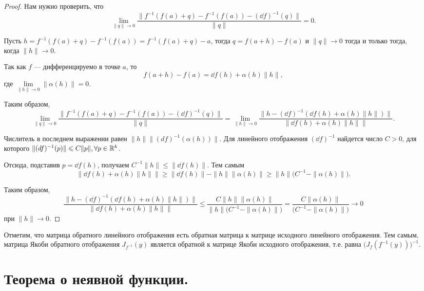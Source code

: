 \documentclass[a4paper]{article}
\theoremstyle{named}
\begin{document}
    \begin{proof}
        Нам нужно проверить, что
        $$
            \lim\limits_{\|q\|\to0}\dfrac{\|f^{-1}(f(a) + q)-f^{-1}(f(a)) - (\dd f)^{-1}(q)\|}{\|q\|}=0.
        $$

        Пусть $h=f^{-1}(f(a) + q)-f^{-1}(f(a))=f^{-1}(f(a) + q)-a$, тогда $q = f(a+h)-f(a)$ и $\|q\|\to 0$ тогда и только тогда, когда $\|h\|\to0$.

        Так как $f$ --- дифференцируемо в точке $a$, то $$f(a+h)-f(a) = \dd f(h)+\alpha(h)\|h\|,$$ где $\lim\limits_{\|h\|\to0}\|\alpha(h)\|=0$.

        Таким образом,
        $$
            \lim\limits_{\|q\|\to0}\dfrac{\|f^{-1}(f(a) + q)-f^{-1}(f(a)) - (\dd f)^{-1}(q)\|}{\|q\|}
            = \lim\limits_{\|h\|\to0}\dfrac{\bigl\|h - (\dd f)^{-1}(\dd f(h)+\alpha(h)\|h\|)\bigr\|}{\bigl\|\dd f(h)+\alpha(h)\|h\|\bigr\|}.
        $$

        Числитель в последнем выражении равен $\|h\|\bigl\|(df)^{-1}(\alpha(h))\bigr\|$. Для линейного отображения $(\dd f)^{-1}$ найдется число $C>0$, для которого $\|(\mathop{}\!d f)^{-1}(p)\| \leqslant C\|p\|,\forall p\in \mathbb{R}^k$.

        Отсюда, подставив $p=\dd f(h)$, получаем $C^{-1}\|h\|\leq\|\dd f(h)\|$. Тем самым $$\bigl\|\dd f(h)+\alpha(h)\|h\|\bigr\|\geq\|\dd f(h)\|-\|h\|\|\alpha(h)\|\geq\|h\|\bigl(C^{-1} - \|\alpha(h)\|\bigr).$$

        Таким образом,
        $$
            \dfrac{\bigl\|h - (\dd f)^{-1}(\dd f(h)+\alpha(h)\|h\|)\bigr\|}{\bigl\|\dd f(h)+\alpha(h)\|h\|\bigr\|}
            \leq \dfrac{C\|h\|\|\alpha(h)\|}{\|h\|\bigl(C^{-1} - \|\alpha(h)\|\bigr)}=
            \dfrac{C\|\alpha(h)\|}{\bigl(C^{-1} - \|\alpha(h)\|\bigr)}\to0
        $$
        при $\|h\|\to 0$.
    \end{proof}

    \begin{remark*}
        Отметим, что матрица обратного линейного отображения есть обратная матрица к матрице исходного линейного отображения.
        Тем самым, матрица Якоби обратного отображения $J_{f^{-1}}(y)$ является обратной к матрице Якоби исходного отображения,
        т.е. равна $\bigr(J_f(f^{-1}(y))\bigl)^{-1}$.
    \end{remark*}

    \section{Теорема о неявной функции.}
\end{document}
